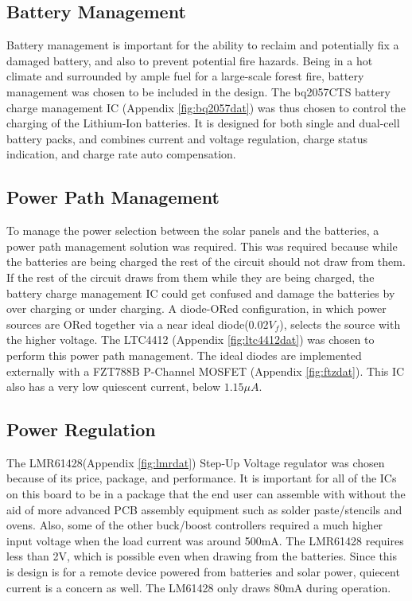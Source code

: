 \documentclass{article}
\numberwithin{figure}{section}
\numberwithin{equation}{section}
\begin{document}
{\subsection{Battery Management} \label{sect:battery_just}
Battery management is important for the ability to reclaim and potentially fix a damaged battery, and also to prevent potential fire hazards. Being in a hot climate and surrounded by ample fuel for a large-scale forest fire, battery management was chosen to be included in the design. The bq2057CTS battery charge management IC (Appendix \ref{fig:bq2057dat}) was thus chosen to control the charging of the Lithium-Ion batteries. It is designed for both single and dual-cell battery packs, and combines current and voltage regulation, charge status indication, and charge rate auto compensation.

\subsection{Power Path Management} \label{sect_pow_just}
To manage the power selection between the solar panels and the batteries, a power path management solution was required. This was required because while the batteries are being charged the rest of the circuit should not draw from them. If the rest of the circuit draws from them while they are being charged, the battery charge management IC could get confused and damage the batteries by over charging or under charging. A diode-ORed configuration, in which power sources are ORed together via a near ideal diode($0.02V_f$), selects the source with the higher voltage. The LTC4412 (Appendix \ref{fig:ltc4412dat}) was chosen to perform this power path management. The ideal diodes are implemented externally with a FZT788B P-Channel MOSFET (Appendix \ref{fig:ftzdat}). This IC also has a very low quiescent current, below $1.15\mu A$.

\subsection{Power Regulation} \label{sect:reg_just}
The LMR61428(Appendix \ref{fig:lmrdat}) Step-Up Voltage regulator was chosen because of its price, package, and performance. It is important for all of the ICs on this board to be in a package that the end user can assemble with without the aid of more advanced PCB assembly equipment such as solder paste/stencils and ovens. Also, some of the other buck/boost controllers required a much higher input voltage when the load current was around 500mA. The LMR61428 requires less than 2V, which is possible even when drawing from the batteries. Since this is design is for a remote device powered from batteries and solar power, quiecent current is a concern as well. The LM61428 only draws 80mA during operation.

}
\end{document}
